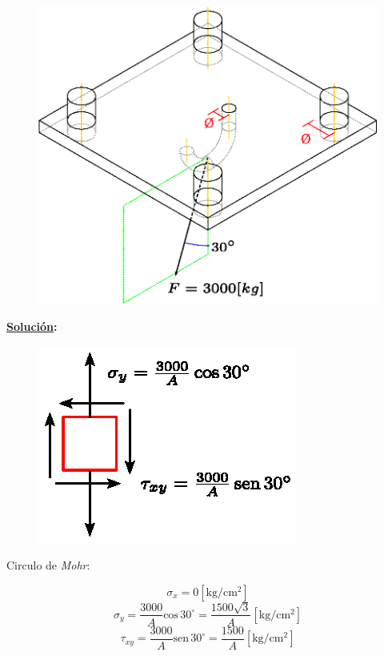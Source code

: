 \documentclass[letter,10pt,twoside]{article}
\begin{document}
\begin{figure}[H]
\centering
\includegraphics[scale=0.75]{resources/f74.eps}
\end{figure}

\textbf{\underline{Solución}:} \\

\begin{figure}[H]
\centering
\includegraphics[scale=1.2]{resources/f70.eps}
\end{figure}

Circulo de \emph{Mohr}:

\begin{equation*}
    \sigma_x = 0[\text{kg}/\text{cm}^2]
\end{equation*}
\begin{equation*}
    \sigma_y = \frac{3000}{A}\text{cos}\,30^\circ
             = \frac{1500 \sqrt{3}}{A}[\text{kg}/\text{cm}^2]
\end{equation*}
\begin{equation*}
    \tau_{xy} = \frac{3000}{A}\text{sen}\,30^\circ
              = \frac{1500}{A}[\text{kg}/\text{cm}^2]
\end{equation*}
\end{document}
